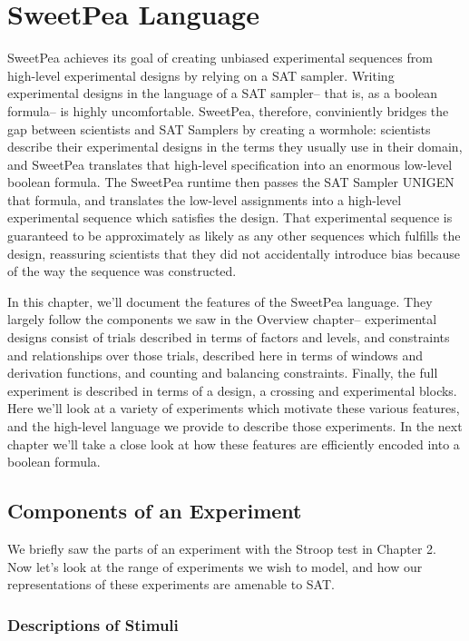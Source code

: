 
\chapter{SweetPea Language}

SweetPea achieves its goal of creating unbiased experimental sequences from high-level experimental designs by relying on a SAT sampler. Writing experimental designs in the language of a SAT sampler-- that is, as a boolean formula-- is highly uncomfortable. SweetPea, therefore, conviniently bridges the gap between scientists and SAT Samplers by creating a wormhole: scientists describe their experimental designs in the terms they usually use in their domain, and SweetPea translates that high-level specification into an enormous low-level boolean formula. The SweetPea runtime then passes the SAT Sampler UNIGEN that formula, and translates the low-level assignments into a high-level experimental sequence which satisfies the design. That experimental sequence is guaranteed to be approximately as likely as any other sequences which fulfills the design, reassuring scientists that they did not accidentally introduce bias because of the way the sequence was constructed.

In this chapter, we'll document the features of the SweetPea language. They largely follow the components we saw in the Overview chapter-- experimental designs consist of trials described in terms of factors and levels, and constraints and relationships over those trials, described here in terms of windows and derivation functions, and counting and balancing constraints. Finally, the full experiment is described in terms of a design, a crossing and experimental blocks. Here we'll look at a variety of experiments which motivate these various features, and the high-level language we provide to describe those experiments. In the next chapter we'll take a close look at how these features are efficiently encoded into a boolean formula.


\section{Components of an Experiment}

We briefly saw the parts of an experiment with the Stroop test in Chapter 2. Now let's look at the range of experiments we wish to model, and how our representations of these experiments are amenable to SAT.

\subsection{Descriptions of Stimuli}

